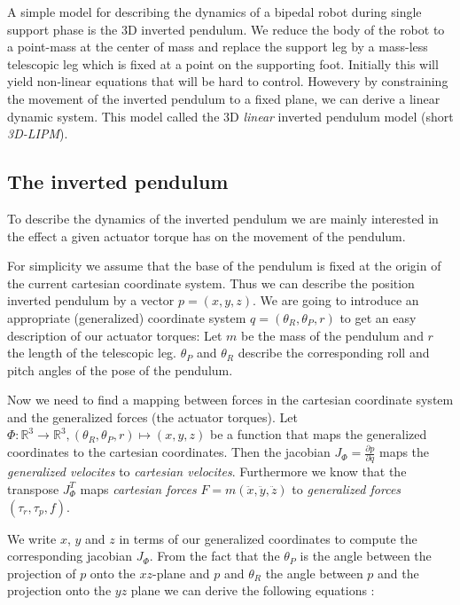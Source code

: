 \documentclass[english,ngerman]{KITreprt}
\newcommand{\clr}[2]{{\color{#1}{#2}}}
\newcommand{\todo}[1]{\marginpar{\clr{red}{#1}}}
\begin{document}
\todo{picture of 3D-LIPM}

A simple model for describing the dynamics of a bipedal robot during
single support phase is the 3D inverted pendulum. We reduce the body of
the robot to a point-mass at the center of mass and replace the support
leg by a mass-less telescopic leg which is fixed at a point on the
supporting foot. Initially this will yield non-linear equations that
will be hard to control. Howevery by constraining the movement of the
inverted pendulum to a fixed plane, we can derive a linear dynamic
system. This model called the 3D \emph{linear} inverted pendulum model
(short \emph{3D-LIPM}).

\subsection{The inverted pendulum}\label{the-inverted-pendulum}

To describe the dynamics of the inverted pendulum we are mainly
interested in the effect a given actuator torque has on the movement of
the pendulum.

For simplicity we assume that the base of the pendulum is fixed at the
origin of the current cartesian coordinate system. Thus we can describe
the position inverted pendulum by a vector $p = (x, y, z)$. We are going
to introduce an appropriate (generalized) coordinate system
$q = (\theta_R, \theta_P, r)$ to get an easy description of our actuator
torques: Let $m$ be the mass of the pendulum and $r$ the length of the
telescopic leg. $\theta_P$ and $\theta_R$ describe the corresponding
roll and pitch angles of the pose of the pendulum.
\todo{add image with angles here}

Now we need to find a mapping between forces in the cartesian coordinate
system and the generalized forces (the actuator torques). Let
$\Phi: \mathbb{R}^3 \longrightarrow \mathbb{R}^3, (\theta_R, \theta_P, r) \mapsto (x, y, z)$
be a function that maps the generalized coordinates to the cartesian
coordinates. Then the jacobian $J_\Phi = \frac{\partial p}{\partial q}$
maps the \emph{generalized velocites} to \emph{cartesian velocites}.
Furthermore we know that the transpose $J_\Phi^T$ maps \emph{cartesian
forces} $F = m (\ddot x, \ddot y, \ddot z)$ to \emph{generalized forces}
$(\tau_r, \tau_p, f)$.

We write $x$, $y$ and $z$ in terms of our generalized coordinates to
compute the corresponding jacobian $J_\Phi$. From the fact that the
$\theta_P$ is the angle between the projection of $p$ onto the
$xz$-plane and $p$ and $\theta_R$ the angle between $p$ and the
projection onto the $yz$ plane we can derive the following equations
\todo{reference paper}:
\end{document}
